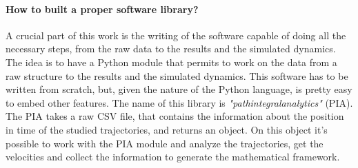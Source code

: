 \documentclass[class=article, crop=false]{standalone}
\begin{document}
\paragraph{How to built a proper software library?}
A crucial part of this work is the writing of the software capable of doing all the necessary steps, from the raw data to the results and the simulated dynamics.
The idea is to have a Python module that permits to work on the data from a raw structure to the results and the simulated dynamics.
This software has to be written from scratch, but, given the nature of the Python language, is pretty easy to embed other features.
The name of this library is \emph{"pathintegralanalytics"} (PIA).
The PIA takes a raw CSV file, that contains the information about the position in time of the studied trajectories, and returns an object.
On this object it's possible to work with the PIA module and analyze the trajectories, get the velocities and collect the information to generate the mathematical framework.



\end{document}
